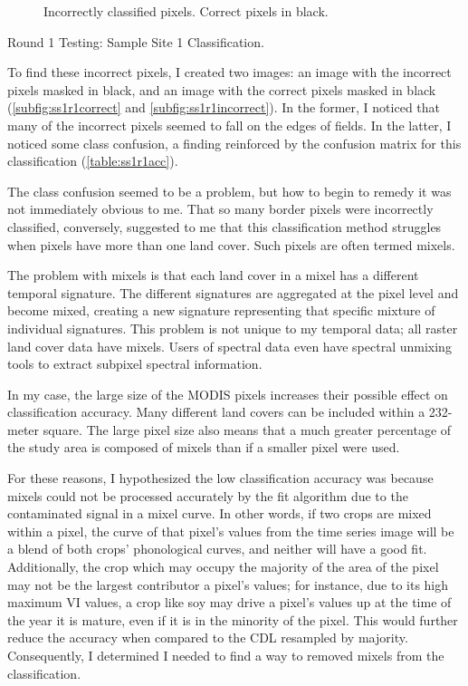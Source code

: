 \begin{ssfigure}
\begin{subfigure}[b]{.475\textwidth}
    \caption{Incorrectly classified pixels. Correct pixels in black.}
    \label{subfig:ss1r1incorrect}
  \end{subfigure}
  \caption{Round 1 Testing: Sample Site 1 Classification.}
  \label{fig:ss1r1class}
\end{ssfigure}

To find these incorrect pixels, I created two images: an image with the incorrect pixels masked in black, and an image with the correct pixels masked in black (\autoref{subfig:ss1r1correct} and \autoref{subfig:ss1r1incorrect}). In the former, I noticed that many of the incorrect pixels seemed to fall on the edges of fields. In the latter, I noticed some class confusion, a finding reinforced by the confusion matrix for this classification (\autoref{table:ss1r1acc}).

The class confusion seemed to be a problem, but how to begin to remedy it was not immediately obvious to me. That so many border pixels were incorrectly classified, conversely, suggested to me that this classification method struggles when pixels have more than one land cover. Such pixels are often termed mixels.

The problem with mixels is that each land cover in a mixel has a different temporal signature. The different signatures are aggregated at the pixel level and become mixed, creating a new signature representing that specific mixture of individual signatures. This problem is not unique to my temporal data; all raster land cover data have mixels. Users of spectral data even have spectral unmixing tools to extract subpixel spectral information. 

In my case, the large size of the MODIS pixels increases their possible effect on classification accuracy. Many different land covers can be included within a 232-meter square. The large pixel size also means that a much greater percentage of the study area is composed of mixels than if a smaller pixel were used.

For these reasons, I hypothesized the low classification accuracy was because mixels could not be processed accurately by the fit algorithm due to the contaminated signal in a mixel curve. In other words, if two crops are mixed within a pixel, the curve of that pixel’s values from the time series image will be a blend of both crops’ phonological curves, and neither will have a good fit. Additionally, the crop which may occupy the majority of the area of the pixel may not be the largest contributor a pixel’s values; for instance, due to its high maximum VI values, a crop like soy may drive a pixel’s values up at the time of the year it is mature, even if it is in the minority of the pixel. This would further reduce the accuracy when compared to the CDL resampled by majority. Consequently, I determined I needed to find a way to removed mixels from the classification.

